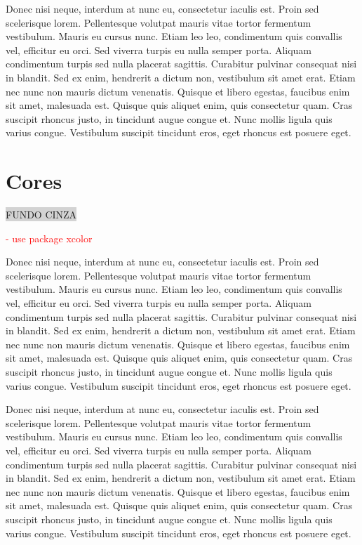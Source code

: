 \documentclass[12pt]{article}
\begin{document}
Donec nisi neque, interdum at nunc eu, consectetur iaculis est. Proin sed scelerisque lorem. Pellentesque volutpat mauris vitae tortor fermentum vestibulum. Mauris eu cursus nunc. Etiam leo leo, condimentum quis convallis vel, efficitur eu orci. Sed viverra turpis eu nulla semper porta. Aliquam condimentum turpis sed nulla placerat sagittis. Curabitur pulvinar consequat nisi in blandit. Sed ex enim, hendrerit a dictum non, vestibulum sit amet erat. Etiam nec nunc non mauris dictum venenatis. Quisque et libero egestas, faucibus enim sit amet, malesuada est. Quisque quis aliquet enim, quis consectetur quam. Cras suscipit rhoncus justo, in tincidunt augue congue et. Nunc mollis ligula quis varius congue. Vestibulum suscipit tincidunt eros, eget rhoncus est posuere eget.



\section{Cores}

\pagecolor{yellow}
\colorbox{lightgray}{FUNDO CINZA}

\textcolor{red}{- use package xcolor}

Donec nisi neque, interdum at nunc eu, consectetur iaculis est. Proin sed scelerisque lorem. Pellentesque volutpat mauris vitae tortor fermentum vestibulum. Mauris eu cursus nunc. Etiam leo leo, condimentum quis convallis vel, efficitur eu orci. Sed viverra turpis eu nulla semper porta. Aliquam condimentum turpis sed nulla placerat sagittis. Curabitur pulvinar consequat nisi in blandit. Sed ex enim, hendrerit a dictum non, vestibulum sit amet erat. Etiam nec nunc non mauris dictum venenatis. Quisque et libero egestas, faucibus enim sit amet, malesuada est. Quisque quis aliquet enim, quis consectetur quam. Cras suscipit rhoncus justo, in tincidunt augue congue et. Nunc mollis ligula quis varius congue. Vestibulum suscipit tincidunt eros, eget rhoncus est posuere eget.

Donec nisi neque, interdum at nunc eu, consectetur iaculis est. Proin sed scelerisque lorem. Pellentesque volutpat mauris vitae tortor fermentum vestibulum. Mauris eu cursus nunc. Etiam leo leo, condimentum quis convallis vel, efficitur eu orci. Sed viverra turpis eu nulla semper porta. Aliquam condimentum turpis sed nulla placerat sagittis. Curabitur pulvinar consequat nisi in blandit. Sed ex enim, hendrerit a dictum non, vestibulum sit amet erat. Etiam nec nunc non mauris dictum venenatis. Quisque et libero egestas, faucibus enim sit amet, malesuada est. Quisque quis aliquet enim, quis consectetur quam. Cras suscipit rhoncus justo, in tincidunt augue congue et. Nunc mollis ligula quis varius congue. Vestibulum suscipit tincidunt eros, eget rhoncus est posuere eget.
\end{document}
